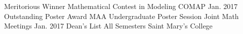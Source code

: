 \begin{cvhonors}
\cvhonor
  {Meritorious Winner}
  {Mathematical Contest in Modeling}
  {COMAP}
  {Jan. 2017}
\cvhonor
  {Outstanding Poster Award}
  {MAA Undergraduate Poster Session}
  {Joint Math Meetings}
  {Jan. 2017}
\cvhonor
  {Dean's List}
  {All Semesters}
  {Saint Mary's College}
  {}
\end{cvhonors}

